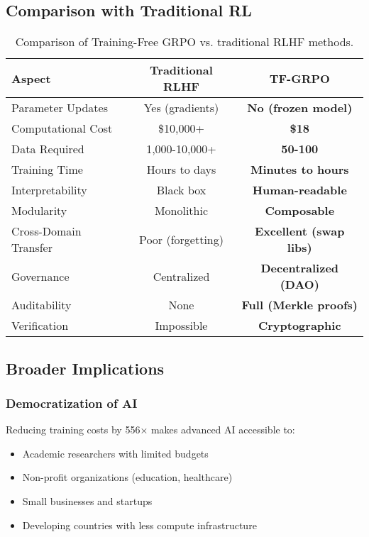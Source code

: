 \documentclass[11pt,a4paper]{article}
\begin{document}
\subsection{Comparison with Traditional RL}

\begin{table}[h]
\centering
\caption{Comparison of Training-Free GRPO vs. traditional RLHF methods.}
\label{tab:comparison}
\begin{tabular}{@{}lcc@{}}
\toprule
\textbf{Aspect} & \textbf{Traditional RLHF} & \textbf{TF-GRPO} \\
\midrule
Parameter Updates & Yes (gradients) & \textbf{No (frozen model)} \\
Computational Cost & \$10,000+ & \textbf{\$18} \\
Data Required & 1,000-10,000+ & \textbf{50-100} \\
Training Time & Hours to days & \textbf{Minutes to hours} \\
Interpretability & Black box & \textbf{Human-readable} \\
Modularity & Monolithic & \textbf{Composable} \\
Cross-Domain Transfer & Poor (forgetting) & \textbf{Excellent (swap libs)} \\
Governance & Centralized & \textbf{Decentralized (DAO)} \\
Auditability & None & \textbf{Full (Merkle proofs)} \\
Verification & Impossible & \textbf{Cryptographic} \\
\bottomrule
\end{tabular}
\end{table}

\subsection{Broader Implications}

\subsubsection{Democratization of AI}
Reducing training costs by 556× makes advanced AI accessible to:
\begin{itemize}
    \item Academic researchers with limited budgets
    \item Non-profit organizations (education, healthcare)
    \item Small businesses and startups
    \item Developing countries with less compute infrastructure
\end{itemize}
\end{document}
